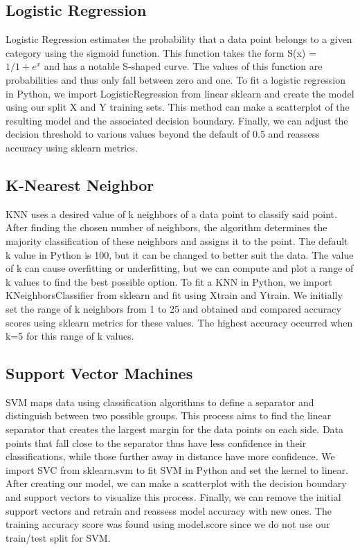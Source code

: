\documentclass{article}
\begin{document}
\subsection{Logistic Regression}
Logistic Regression estimates the probability that a data point belongs to a given category using the sigmoid function. This function takes the form S(x) = \(1/1+e^x\) and has a notable S-shaped curve. The values of this function are probabilities and thus only fall between zero and one. To fit a logistic regression in Python, we import LogisticRegression from linear sklearn and create the model using our split X and Y training sets. This method can make a scatterplot of the resulting model and the associated decision boundary. Finally, we can adjust the decision threshold to various values beyond the default of 0.5 and reassess accuracy using sklearn metrics.  
\subsection{K-Nearest Neighbor}
KNN uses a desired value of k neighbors of a data point to classify said point. After finding the chosen number of neighbors, the algorithm determines the majority classification of these neighbors and assigns it to the point. The default k value in Python is 100, but it can be changed to better suit the data. The value of k can cause overfitting or underfitting, but we can compute and plot a range of k values to find the best possible option. To fit a KNN in Python, we import KNeighborsClassifier from sklearn and fit using Xtrain and Ytrain. We initially set the range of k neighbors from 1 to 25 and obtained and compared accuracy scores using sklearn metrics for these values. The highest accuracy occurred when k=5 for this range of k values.  
\subsection{Support Vector Machines}
SVM maps data using classification algorithms to define a separator and distinguish between two possible groups. This process aims to find the linear separator that creates the largest margin for the data points on each side. Data points that fall close to the separator thus have less confidence in their classifications, while those further away in distance have more confidence. We import SVC from sklearn.svm to fit SVM in Python and set the kernel to linear. After creating our model, we can make a scatterplot with the decision boundary and support vectors to visualize this process. Finally, we can remove the initial support vectors and retrain and reassess model accuracy with new ones. The training accuracy score was found using model.score since we do not use our train/test split for SVM.  
\end{document}
